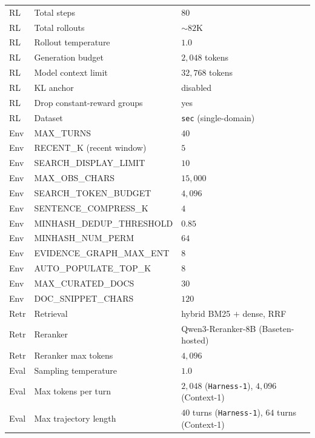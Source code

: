 \documentclass{article}
\newcommand{\sys}{\texttt{Harness-1}\xspace}
\begin{document}
\begin{table}[ht]
\begin{tabular}{lll}
RL  & Total steps                & $80$ \\
RL  & Total rollouts             & ${\sim}82$K \\
RL  & Rollout temperature        & $1.0$ \\
RL  & Generation budget          & $2{,}048$ tokens \\
RL  & Model context limit        & $32{,}768$ tokens \\
RL  & KL anchor                  & disabled \\
RL  & Drop constant-reward groups& yes \\
RL  & Dataset                    & \texttt{sec} (single-domain) \\
\midrule
Env & MAX\_TURNS                 & $40$ \\
Env & RECENT\_K (recent window)  & $5$ \\
Env & SEARCH\_DISPLAY\_LIMIT     & $10$ \\
Env & MAX\_OBS\_CHARS            & $15{,}000$ \\
Env & SEARCH\_TOKEN\_BUDGET      & $4{,}096$ \\
Env & SENTENCE\_COMPRESS\_K      & $4$ \\
Env & MINHASH\_DEDUP\_THRESHOLD  & $0.85$ \\
Env & MINHASH\_NUM\_PERM         & $64$ \\
Env & EVIDENCE\_GRAPH\_MAX\_ENT  & $8$ \\
Env & AUTO\_POPULATE\_TOP\_K     & $8$ \\
Env & MAX\_CURATED\_DOCS         & $30$ \\
Env & DOC\_SNIPPET\_CHARS        & $120$ \\
\midrule
Retr & Retrieval                 & hybrid BM25 $+$ dense, RRF \\
Retr & Reranker                  & Qwen3-Reranker-8B (Baseten-hosted) \\
Retr & Reranker max tokens       & $4{,}096$ \\
\midrule
Eval & Sampling temperature      & $1.0$ \\
Eval & Max tokens per turn       & $2{,}048$ (\sys), $4{,}096$ (Context-1) \\
Eval & Max trajectory length     & $40$ turns (\sys), $64$ turns (Context-1) \\
\bottomrule
\end{tabular}
\end{table}
\end{document}
